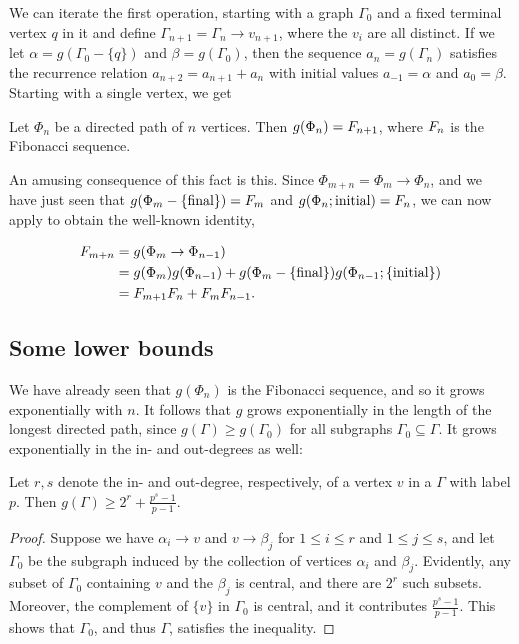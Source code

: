 We can iterate the first operation, starting with a graph $\Gamma_0$ and a fixed terminal vertex $q$ in it and define $\Gamma_{n + 1} = \Gamma_{n} \rightarrow v_{n + 1}$, where the $v_i$ are all distinct.
If we let $\alpha = g(\Gamma_0 - \{q\})$ and $\beta = g(\Gamma_0)$, then the sequence $a_n = g(\Gamma_n)$ satisfies the recurrence relation $a_{n + 2} = a_{n + 1} + a_{n}$ with initial values $a_{-1} = \alpha$ and $a_0 = \beta$.
Starting with a single vertex, we get

\begin{prop}
	Let $\Phi_n$ be a directed path of $n$ vertices.
Then $g(\Phi_n) = F_{n + 1}$, where $F_{n}$ is the Fibonacci sequence.
\end{prop}

An amusing consequence of this fact is this.
Since $\Phi_{m + n} = \Phi_m \rightarrow \Phi_n$, and we have just seen that $g(\Phi_m - \{\text{final}\}) = F_{m}$ and $g(\Phi_n; \text{initial}) = F_{n}$, 
we can now apply \hyperref[eustick]{} to obtain the well-known identity, \begin{enumrealm}
\begin{align*}
	F_{m + n} &= g(\Phi_m \rightarrow \Phi_{n - 1}) \\
	&= g(\Phi_m)g(\Phi_{n - 1}) + g(\Phi_m - \{\text{final}\})g(\Phi_{n - 1}; \{\text{initial}\}) \\
	&= F_{m + 1}F_{n} + F_{m}F_{n - 1}.
\end{align*}\end{enumrealm}
\vspace{-\baselineskip}
\subsection{Some lower bounds}
We have already seen that $g(\Phi_n)$ is the Fibonacci sequence, and so it grows exponentially with $n$.
It follows that $g$ grows exponentially in the length of the longest directed path, since $g(\Gamma) \ge  g(\Gamma_0)$ for all subgraphs $\Gamma_0 \subseteq \Gamma$.
It grows exponentially in the in- and out-degrees as well:
\begin{lem}
	Let $r, s$ denote the in- and out-degree, respectively, of a vertex $v$ in a  $\Gamma$ with label $p$.
Then $g(\Gamma) \ge 2^r + \frac{p^s - 1}{p - 1}$.
\end{lem}
\begin{proof}
	Suppose we have $\alpha_i \rightarrow v$ and $v \rightarrow \beta_j$ for $1 \le i \le r$ and $1 \le j \le s$, and let $\Gamma_0$ be the subgraph induced by the collection of vertices $\alpha_i$ and $\beta_j$.
Evidently, any subset of $\Gamma_0$ containing $v$ and the $\beta_j$ is central, and there are $2^r$ such subsets.
Moreover, the complement of $\{v\}$ in $\Gamma_0$ is central, and it contributes $\frac{p^s - 1}{p - 1}$.
This shows that $\Gamma_0$, and thus $\Gamma$, satisfies the inequality.
\end{proof}

